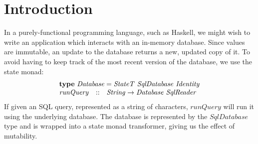 \section{Introduction}
\label{sec:introduction}

In a purely-functional programming language, such as Haskell, we might wish to write an application which interacts with an in-memory database. Since values are immutable, an update to the database returns a new, updated copy of it. To avoid having to keep track of the most recent version of the database, we use the state monad:
\begin{displaymath}
\begin{array}{lcl}
\multicolumn{3}{l}{\mathbf{type}~\mathit{Database} = \mathit{StateT}~\mathit{SqlDatabase}~\mathit{Identity}}\\
\mathit{runQuery} & :: & \mathit{String} \to \mathit{Database}~\mathit{SqlReader}
\end{array}
\end{displaymath}
If given an SQL query, represented as a string of characters, $\mathit{runQuery}$ will run it using the underlying database. The database is represented by the $\mathit{SqlDatabase}$ type and is wrapped into a state monad transformer, giving us the effect of mutability. 

